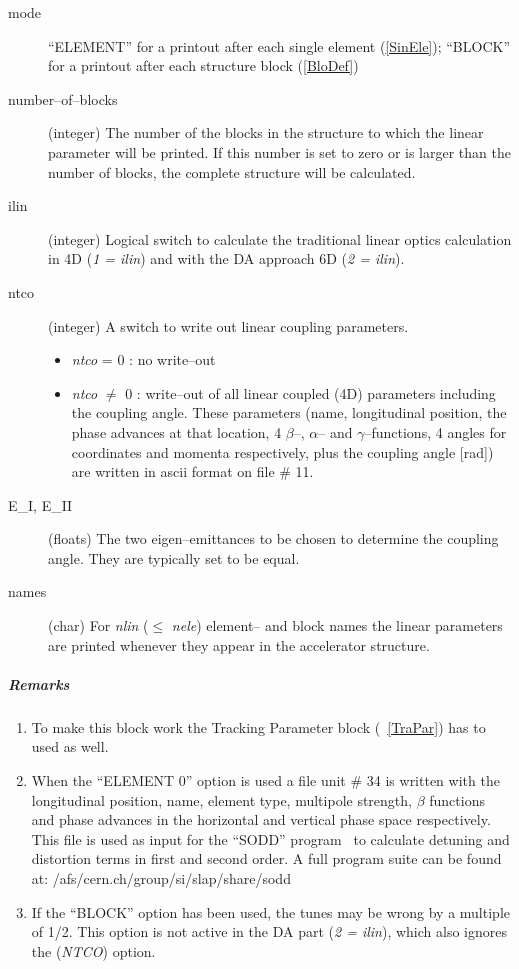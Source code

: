\documentclass[a4paper,11pt]{report}
\begin{document}
\begin{description}
\item [mode] ``ELEMENT'' for a printout after each single element
  (\ref{SinEle}); ``BLOCK'' for a printout after each structure block
  (\ref{BloDef})
\item [number--of--blocks] (integer) The number of the blocks in the
  structure to which the linear parameter will be printed. If this
  number is set to zero or is larger than the number of blocks, the
  complete structure will be calculated.
\item [ilin] (integer) Logical switch to calculate the traditional
  linear optics calculation in 4D ({\it 1 = ilin}) and with the DA
  approach 6D ({\it 2 = ilin}).
\item [ntco] (integer) A switch to write out linear coupling
  parameters.
 \begin{itemize}
 \item {\em ntco} \/= 0 : no write--out
 \item {\em ntco} \/$\neq$ 0 : write--out of all linear coupled (4D)
   parameters including the coupling angle.  These parameters (name,
   longitudinal position, the phase advances at that location, 4
   $\beta$--, $\alpha$-- and $\gamma$--functions, 4 angles for
   coordinates and momenta respectively, plus the coupling angle
   [rad]) are written in ascii format on file \# 11.
 \end{itemize}
\item [E\_I, E\_II] (floats) The two eigen--emittances to be chosen to
  determine the coupling angle. They are typically set to be equal.
\item [names] (char) For {\em nlin} \/($\leq $ {\em nele}\/) element--
  and block names the linear parameters are printed whenever they
  appear in the accelerator structure.
\end{description}

\subparagraph{Remarks}
\begin{enumerate}
\item To make this block work the Tracking Parameter block
  (~\ref{TraPar}) has to used as well.
\item When the ``ELEMENT 0'' option is used a file unit \# 34 is
  written with the longitudinal position, name, element type,
  multipole strength, $\beta$ functions and phase advances in the
  horizontal and vertical phase space respectively. This file is used
  as input for the ``SODD'' program~\cite{SODD} to calculate detuning
  and distortion terms in first and second order. A full program suite
  can be found at: /afs/cern.ch/group/si/slap/share/sodd
\item If the ``BLOCK'' option has been used, the tunes may be wrong by
  a multiple of 1/2. This option is not active in the DA part ({\it 2
    = ilin}), which also ignores the ({\it NTCO}) option.
\end{enumerate}
\end{document}
